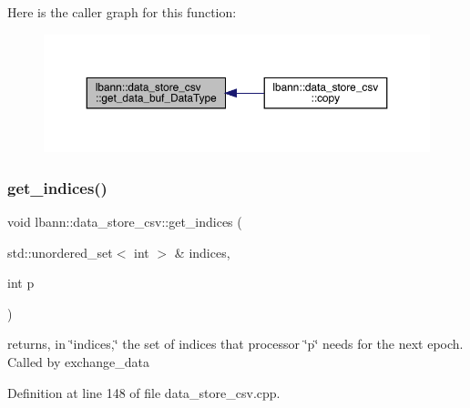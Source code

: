 Here is the caller graph for this function\+:\nopagebreak
\begin{figure}[H]
\begin{center}
\leavevmode
\includegraphics[width=350pt]{classlbann_1_1data__store__csv_a3125cf637d40e8908c68bb74690f06da_icgraph}
\end{center}
\end{figure}
\mbox{\label{classlbann_1_1data__store__csv_ae0deaa88a2f5164569f796f7d35510d8}} 
\subsubsection{\texorpdfstring{get\+\_\+indices()}{get\_indices()}}
{\footnotesize\ttfamily void lbann\+::data\+\_\+store\+\_\+csv\+::get\+\_\+indices (\begin{DoxyParamCaption}\item[{std\+::unordered\+\_\+set$<$ int $>$ \&}]{indices,  }\item[{int}]{p }\end{DoxyParamCaption})\hspace{0.3cm}{\ttfamily [protected]}}

returns, in \char`\"{}indices,\char`\"{} the set of indices that processor \char`\"{}p\char`\"{} needs for the next epoch. Called by exchange\+\_\+data 

Definition at line 148 of file data\+\_\+store\+\_\+csv.\+cpp.


